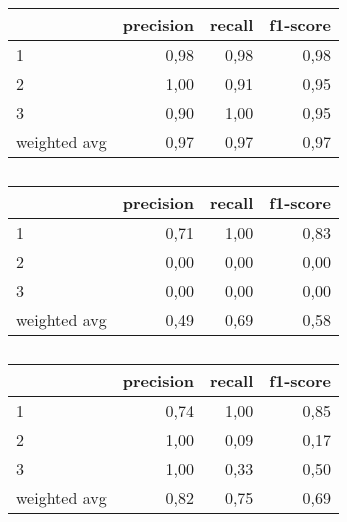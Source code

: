 \begin{table}
\centering
\caption{}%
\begin{tabular}{lrrr}
\toprule
{} &  precision &  recall &  f1-score \\
\midrule
1            &       0,98 &    0,98 &      0,98 \\
2            &       1,00 &    0,91 &      0,95 \\
3            &       0,90 &    1,00 &      0,95 \\
weighted avg &       0,97 &    0,97 &      0,97 \\
\bottomrule
\end{tabular}
\end{table}

\begin{table}
\centering
\caption{}%
\begin{tabular}{lrrr}
\toprule
{} &  precision &  recall &  f1-score \\
\midrule
1            &       0,71 &    1,00 &      0,83 \\
2            &       0,00 &    0,00 &      0,00 \\
3            &       0,00 &    0,00 &      0,00 \\
weighted avg &       0,49 &    0,69 &      0,58 \\
\bottomrule
\end{tabular}
\end{table}

\begin{table}
\centering
\caption{}%
\begin{tabular}{lrrr}
\toprule
{} &  precision &  recall &  f1-score \\
\midrule
1            &       0,74 &    1,00 &      0,85 \\
2            &       1,00 &    0,09 &      0,17 \\
3            &       1,00 &    0,33 &      0,50 \\
weighted avg &       0,82 &    0,75 &      0,69 \\
\bottomrule
\end{tabular}
\end{table}

